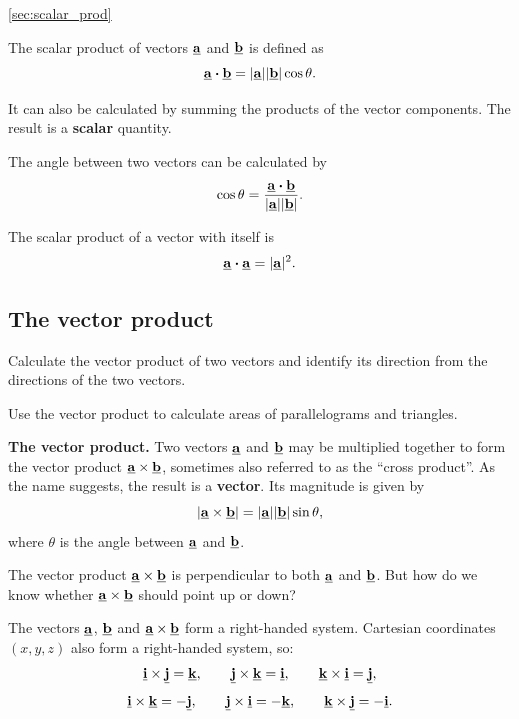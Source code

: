 \begin{recap}{\ref{sec:scalar_prod}}
\item The scalar product of vectors $\underline{\mathbf{a}}$ and $\underline{\mathbf{b}}$ is defined as
\[
\underline{\mathbf{a}}\boldsymbol{\cdot}\underline{\mathbf{b}}
=\lvert\underline{\mathbf{a}}\rvert\lvert\underline{\mathbf{b}}\rvert\cos\theta.
\]
\item It can also be calculated by summing the products of the vector components. The result is a \textbf{scalar} quantity.
\item The angle between two vectors can be calculated by
\[
\cos\theta
=\frac{\underline{\mathbf{a}}\boldsymbol{\cdot}\underline{\mathbf{b}}}
{\lvert\underline{\mathbf{a}}\rvert\lvert\underline{\mathbf{b}}\rvert}.
\]
\item The scalar product of a vector with itself is
\[
\underline{\mathbf{a}}\boldsymbol{\cdot}\underline{\mathbf{a}}
=\lvert\underline{\mathbf{a}}\rvert^2.
\]
\end{recap}

\subsection{The vector product}
\label{sec:cross_prod}

\begin{learningoutcomes}
\item Calculate the vector product of two vectors and identify its direction from the directions of the two vectors.
\item Use the vector product to calculate areas of parallelograms and triangles.
\end{learningoutcomes}

\textbf{The vector product.} Two vectors $\underline{\mathbf{a}}$ and $\underline{\mathbf{b}}$ may be multiplied together to form the vector product $\underline{\mathbf{a}}\times\underline{\mathbf{b}}$, sometimes also referred to as the ``cross product''.  As the name suggests, the result is a \textbf{vector}. Its magnitude is given by
\begin{equation}
\left\lvert\underline{\mathbf{a}}\times\underline{\mathbf{b}}\right\rvert
=\lvert\underline{\mathbf{a}}\rvert\lvert\underline{\mathbf{b}}\rvert\sin\theta,    
\end{equation}
where $\theta$ is the angle between $\underline{\mathbf{a}}$ and $\underline{\mathbf{b}}$.

The vector product $\underline{\mathbf{a}}\times\underline{\mathbf{b}}$ is perpendicular to both $\underline{\mathbf{a}}$ and $\underline{\mathbf{b}}$. But how do we know whether $\underline{\mathbf{a}}\times\underline{\mathbf{b}}$ should point up or down?

The vectors $\underline{\mathbf{a}}$, $\underline{\mathbf{b}}$ and $\underline{\mathbf{a}}\times\underline{\mathbf{b}}$ form a right-handed system. Cartesian coordinates $(x,y,z)$ also form a right-handed system, so:
\[
\underline{\mathbf{i}}\times\underline{\mathbf{j}}=\underline{\mathbf{k}},
\qquad
\underline{\mathbf{j}}\times\underline{\mathbf{k}}=\underline{\mathbf{i}},
\qquad
\underline{\mathbf{k}}\times\underline{\mathbf{i}}=\underline{\mathbf{j}},
\]
\[
\underline{\mathbf{i}}\times\underline{\mathbf{k}}=-\underline{\mathbf{j}},
\qquad
\underline{\mathbf{j}}\times\underline{\mathbf{i}}=-\underline{\mathbf{k}},
\qquad
\underline{\mathbf{k}}\times\underline{\mathbf{j}}=-\underline{\mathbf{i}}.
\]

